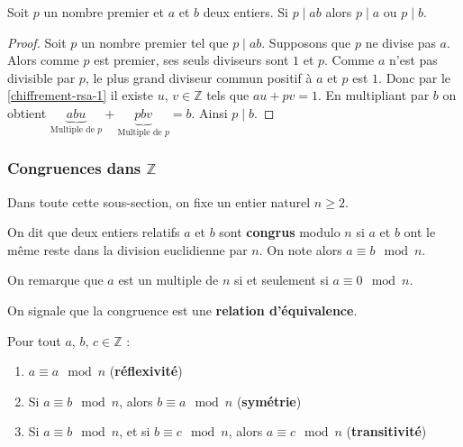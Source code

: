  \begin{lemma}[Euclide]
    \label{chiffrement-rsa-4}
    Soit $p$ un nombre premier et $a$ et $b$ deux entiers. Si $p \mid ab$ alors $p \mid a$ ou $p \mid b$.
  \end{lemma}
  
  \begin{proof}
    Soit $p$ un nombre premier tel que $p \mid ab$. Supposons que $p$ ne divise pas $a$. Alors comme $p$ est premier, ses seuls diviseurs sont $1$ et $p$. Comme $a$ n'est pas divisible par $p$, le plus grand diviseur commun positif à $a$ et $p$ est $1$. Donc par le \cref{chiffrement-rsa-1} il existe $u$, $v \in \mathbb{Z}$ tels que $au + pv = 1$. En multipliant par $b$ on obtient $\underbrace{abu}_{\text{Multiple de } p} + \underbrace{pbv}_{\text{Multiple de } p} = b$. Ainsi $p \mid b$.
  \end{proof}
  
  \subsubsection{Congruences dans $\mathbb{Z}$}
  
  Dans toute cette sous-section, on fixe un entier naturel $n \geq 2$.
  
  \begin{definition}
    On dit que deux entiers relatifs $a$ et $b$ sont \textbf{congrus} modulo $n$ si $a$ et $b$ ont le même reste dans la division euclidienne par $n$. On note alors $a \equiv b \mod n$.
  \end{definition}
  
  \begin{remark}
    \label{chiffrement-rsa-3}
    On remarque que $a$ est un multiple de $n$ si et seulement si $a \equiv 0 \mod n$.
  \end{remark}
  
  On signale que la congruence est une \textbf{relation d'équivalence}.
  
  \begin{proposition}
    Pour tout $a$, $b$, $c \in \mathbb{Z}$ :
    \begin{enumerate}[label=(\roman*)]
      \item $a \equiv a \mod n$ (\textbf{réflexivité})
      \item Si $a \equiv b \mod n$, alors $b \equiv a \mod n$ (\textbf{symétrie})
      \item Si $a \equiv b \mod n$, et si $b \equiv c \mod n$, alors $a \equiv c \mod n$ (\textbf{transitivité})
    \end{enumerate}
  \end{proposition}
  
